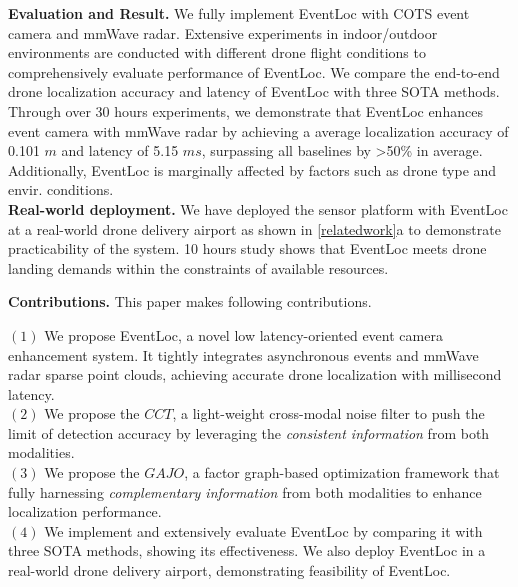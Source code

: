 \noindent \textbf{Evaluation and Result.} 
We fully implement EventLoc with COTS event camera and mmWave radar.
Extensive experiments in indoor/outdoor environments are conducted with different drone flight conditions to comprehensively evaluate performance of EventLoc.
We compare the end-to-end drone localization accuracy and latency of EventLoc with three SOTA methods.
Through over 30 hours experiments, we demonstrate that EventLoc enhances event camera with mmWave radar by achieving a average localization accuracy of 0.101 $m$ and latency of 5.15 $ms$, surpassing all baselines by >50\% in average.
Additionally, EventLoc is marginally affected by factors such as drone type and envir. conditions.\\
\textbf{Real-world deployment.}
We have deployed the sensor platform with EventLoc at a real-world drone delivery airport as shown in \fig \ref{relatedwork}a to demonstrate practicability of the system.
10 hours study shows that EventLoc meets drone landing demands within the constraints of available resources.

\noindent \textbf{Contributions.} This paper makes following contributions.

\noindent $(1)$ We propose EventLoc, a novel low latency-oriented event camera enhancement system. It tightly integrates asynchronous events and mmWave radar sparse point clouds, achieving accurate drone localization with millisecond latency.\\
\noindent $(2)$ We propose the $CCT$, a light-weight cross-modal noise filter to push the limit of detection accuracy by leveraging the \textit{consistent information} from both modalities. \\
\noindent $(3)$  We propose the $GAJO$, a factor graph-based optimization framework that fully harnessing \textit{complementary information} from both modalities to enhance localization performance.\\
\noindent $(4)$ We implement and extensively evaluate EventLoc by comparing it with three SOTA methods, showing its effectiveness. We also deploy EventLoc in a real-world drone delivery airport, demonstrating feasibility of EventLoc.

